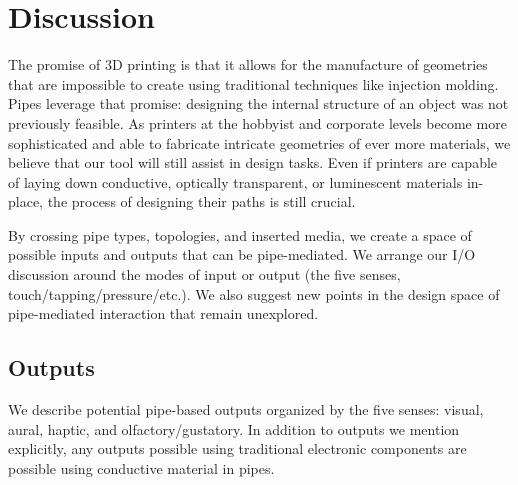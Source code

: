 \section{Discussion}

The promise of 3D printing is that it allows for the manufacture of geometries that are impossible to create using traditional techniques like injection molding.  Pipes leverage that promise: designing the internal structure of an object was not previously feasible.  As printers at the hobbyist and corporate levels become more sophisticated and able to fabricate intricate geometries of ever more materials, we believe that our tool will still assist in design tasks.  Even if printers are capable of laying down conductive, optically transparent, or luminescent materials in-place, the process of designing their paths is still crucial.



By crossing pipe types, topologies, and inserted media, we create a space of possible inputs and outputs that can be pipe-mediated.  We arrange our I/O discussion around the modes of input or output (the five senses, touch/tapping/pressure/etc.).  We also suggest new points in the design space of pipe-mediated interaction that remain unexplored.

\subsection{Outputs}

We describe potential pipe-based outputs organized by the five senses: visual, aural, haptic, and olfactory/gustatory.  In addition to outputs we mention explicitly, any outputs possible using traditional electronic components are possible using conductive material in pipes.

